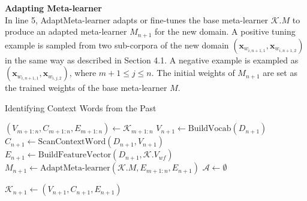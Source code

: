 \textbf{Adapting Meta-learner}\\
In line 5, AdaptMeta-learner adapts or fine-tunes the base meta-learner $\mathcal{K}.M$ to produce an adapted meta-learner $M_{n+1}$ for the new domain.
A positive tuning example is sampled from two sub-corpora of the new domain $(\mathbf{x}_{w_{i, n+1, 1}}, \mathbf{x}_{w_{i, n+1, 2}})$ in the same way as described in Section 4.1.
A negative example is exampled as $(\mathbf{x}_{w_{i, n+1, 1}}, \mathbf{x}_{w_{i, j, 2}})$, where $m+1 \le j \le n$.
The initial weights of $M_{n+1}$ are set as the trained weights of the base meta-learner $M$. 
 
\begin{algorithm*}[H]
\label{chap3:alg:ll}
\LinesNumbered
\DontPrintSemicolon
\caption{Identifying Context Words from the Past}
\BlankLine
\BlankLine
$(V_{m+1:n}, C_{m+1:n}, E_{m+1:n}) \gets \mathcal{K}_{m+1:n}$ \;
$V_{n+1} \gets \text{BuildVocab}(D_{n+1})$ \;
$C_{n+1} \gets \text{ScanContextWord}(D_{n+1}, V_{n+1})$ \;
$E_{n+1} \gets \text{BuildFeatureVector}(D_{n+1}, \mathcal{K}.V_{\textit{wf}})$ \;
$M_{n+1} \gets \text{AdaptMeta-learner}(\mathcal{K}.M, E_{m+1:n}, E_{n+1})$ \;
$\mathcal{A} \gets \emptyset$ \;


$\mathcal{K}_{n+1} \gets (V_{n+1}, C_{n+1}, E_{n+1}) $ \;
\end{algorithm*}

